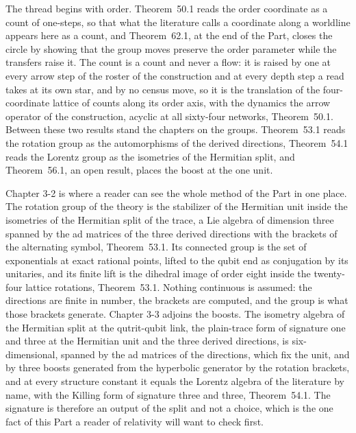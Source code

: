 The thread begins with order. Theorem~50.1 reads the order coordinate as a count of one-steps, so that what the literature calls a coordinate along a worldline appears here as a count, and Theorem~62.1, at the end of the Part, closes the circle by showing that the group moves preserve the order parameter while the transfers raise it. The count is a count and never a flow: it is raised by one at every arrow step of the roster of the construction and at every depth step a read takes at its own star, and by no census move, so it is the translation of the four-coordinate lattice of counts along its order axis, with the dynamics the arrow operator of the construction, acyclic at all sixty-four networks, Theorem~50.1. Between these two results stand the chapters on the groups. Theorem~53.1 reads the rotation group as the automorphisms of the derived directions, Theorem~54.1 reads the Lorentz group as the isometries of the Hermitian split, and Theorem~56.1, an open result, places the boost at the one unit.

Chapter 3-2 is where a reader can see the whole method of the Part in one place. The rotation group of the theory is the stabilizer of the Hermitian unit inside the isometries of the Hermitian split of the trace, a Lie algebra of dimension three spanned by the ad matrices of the three derived directions with the brackets of the alternating symbol, Theorem~53.1. Its connected group is the set of exponentials at exact rational points, lifted to the qubit end as conjugation by its unitaries, and its finite lift is the dihedral image of order eight inside the twenty-four lattice rotations, Theorem~53.1. Nothing continuous is assumed: the directions are finite in number, the brackets are computed, and the group is what those brackets generate. Chapter 3-3 adjoins the boosts. The isometry algebra of the Hermitian split at the qutrit-qubit link, the plain-trace form of signature one and three at the Hermitian unit and the three derived directions, is six-dimensional, spanned by the ad matrices of the directions, which fix the unit, and by three boosts generated from the hyperbolic generator by the rotation brackets, and at every structure constant it equals the Lorentz algebra of the literature by name, with the Killing form of signature three and three, Theorem~54.1. The signature is therefore an output of the split and not a choice, which is the one fact of this Part a reader of relativity will want to check first.

